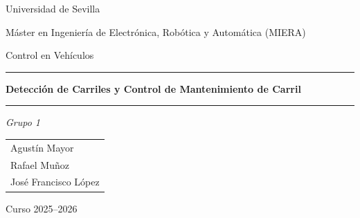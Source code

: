 \documentclass[12pt, a4paper]{article}
\begin{document}

\begin{titlepage}
    \centering
    \vspace*{2cm}
    {\large Universidad de Sevilla \par}
    {\large Máster en Ingeniería de Electrónica, Robótica y Automática (MIERA) \par}
    \vspace{1cm}
    {\large Control en Vehículos \par}
    \vspace{2cm}
    \hrule\vspace{0.5cm}
    {\Huge\bfseries Detección de Carriles y Control de Mantenimiento de Carril \par}
    \vspace{0.5cm}\hrule
    \vspace{2cm}
    {\large\itshape Grupo 1 \par}
    \vspace{1cm}
    \begin{tabular}{l}
        Agustín Mayor \\[4pt]
        Rafael Muñoz \\[4pt]
        José Francisco López
    \end{tabular}
    \vfill
    {\large Curso 2025--2026 \par}
\end{titlepage}

\tableofcontents
\newpage

\begin{abstract}
Este trabajo presenta el diseño e implementación de un sistema de \textit{Lane Keeping Assist} (LKA) para un vehículo autónomo simulado en \textit{CARLA Simulator} e integrado con \textit{ROS2 Humble} mediante contenedores Docker. El sistema consta de tres bloques principales: detección de líneas de carril mediante visión clásica con OpenCV y la transformada de Hough, diseño y sintonización de un controlador PID para mantener el vehículo centrado en el carril, y la integración de ambos módulos en un entorno de simulación realista donde se valida el funcionamiento completo. El código fuente, datasets e imágenes y vídeos demostrativos están disponibles en el repositorio público de GitHub: \url{https://github.com/JoseLopez36/Deteccion-Seguimiento-Carril}.
\end{abstract}

\newpage

\end{document}
